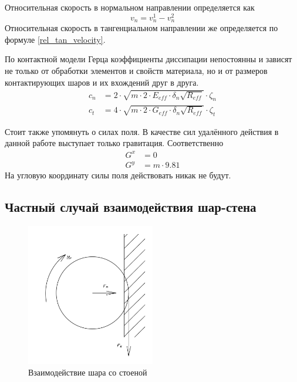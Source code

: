 \documentclass[utf8x, 14pt, oneside, a4paper]{article}
\begin{document}
Относительная скорость в нормальном направлении определяется как
\begin{equation}
v_n = v_n^1 - v_n^2
\end{equation}
Относительная скорость в тангенциальном направлении же определяется по формуле \ref{rel_tan_velocity}.

По контактной модели Герца \cite{aglomerath} коэффициенты диссипации непостоянны и зависят не только от обработки элементов и свойств материала, но и от размеров контактирующих шаров и их вхождений друг в друга.
\begin{align}
\label{kef_dempf}
c_n &= 2 \cdot \sqrt{m \cdot 2 \cdot E_{eff} \cdot \delta_n \sqrt{R_{eff}}} \cdot \zeta_n \\
c_t &= 4 \cdot \sqrt{m \cdot 2 \cdot G_{eff} \cdot \delta_n \sqrt{R_{eff}}} \cdot \zeta_t
\end{align}

Стоит также упомянуть о силах поля.
В качестве сил удалённого действия в данной работе выступает только гравитация.
Соответственно
\begin{align}
G^x &= 0 \\
G^y &= m \cdot 9.81
\end{align}
На угловую координату силы поля действовать никак не будут.

\subsection{Частный случай взаимодействия шар-стена}
\label{wall_subsection}

\begin{figure}[H]
	\centering
	\includegraphics[width=0.5\textwidth]{ball_wall}
	\caption{Взаимодействие шара со стоеной}
	\label{pic:ball_wall}
\end{figure} 
\end{document}

